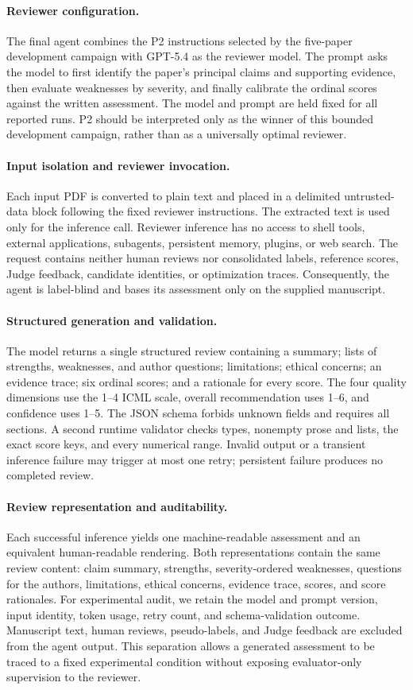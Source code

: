 \documentclass{article}
\begin{document}
\paragraph{Reviewer configuration.}
The final agent combines the P2 instructions selected by the five-paper development campaign with GPT-5.4 as the reviewer model. The prompt asks the model to first identify the paper's principal claims and supporting evidence, then evaluate weaknesses by severity, and finally calibrate the ordinal scores against the written assessment. The model and prompt are held fixed for all reported runs. P2 should be interpreted only as the winner of this bounded development campaign, rather than as a universally optimal reviewer.

\paragraph{Input isolation and reviewer invocation.}
Each input PDF is converted to plain text and placed in a delimited untrusted-data block following the fixed reviewer instructions. The extracted text is used only for the inference call. Reviewer inference has no access to shell tools, external applications, subagents, persistent memory, plugins, or web search. The request contains neither human reviews nor consolidated labels, reference scores, Judge feedback, candidate identities, or optimization traces. Consequently, the agent is label-blind and bases its assessment only on the supplied manuscript.

\paragraph{Structured generation and validation.}
The model returns a single structured review containing a summary; lists of strengths, weaknesses, and author questions; limitations; ethical concerns; an evidence trace; six ordinal scores; and a rationale for every score. The four quality dimensions use the 1--4 ICML scale, overall recommendation uses 1--6, and confidence uses 1--5. The JSON schema forbids unknown fields and requires all sections. A second runtime validator checks types, nonempty prose and lists, the exact score keys, and every numerical range. Invalid output or a transient inference failure may trigger at most one retry; persistent failure produces no completed review.

\paragraph{Review representation and auditability.}
Each successful inference yields one machine-readable assessment and an equivalent human-readable rendering. Both representations contain the same review content: claim summary, strengths, severity-ordered weaknesses, questions for the authors, limitations, ethical concerns, evidence trace, scores, and score rationales. For experimental audit, we retain the model and prompt version, input identity, token usage, retry count, and schema-validation outcome. Manuscript text, human reviews, pseudo-labels, and Judge feedback are excluded from the agent output. This separation allows a generated assessment to be traced to a fixed experimental condition without exposing evaluator-only supervision to the reviewer.
\end{document}
